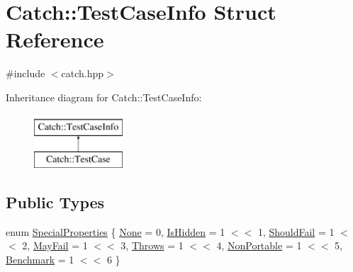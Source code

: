 \hypertarget{struct_catch_1_1_test_case_info}{}\section{Catch\+::Test\+Case\+Info Struct Reference}
\label{struct_catch_1_1_test_case_info}


{\ttfamily \#include $<$catch.\+hpp$>$}

Inheritance diagram for Catch\+::Test\+Case\+Info\+:\begin{figure}[H]
\begin{center}
\leavevmode
\includegraphics[height=2.000000cm]{struct_catch_1_1_test_case_info}
\end{center}
\end{figure}
\subsection*{Public Types}
\begin{DoxyCompactItemize}
\item 
enum \mbox{\hyperlink{struct_catch_1_1_test_case_info_a39b232f74b4a7a6f2183b96759027eac}{Special\+Properties}} \{ \newline
\mbox{\hyperlink{struct_catch_1_1_test_case_info_a39b232f74b4a7a6f2183b96759027eacaf94e9de5f8ec1e53b1aa761ec564b31a}{None}} = 0, 
\mbox{\hyperlink{struct_catch_1_1_test_case_info_a39b232f74b4a7a6f2183b96759027eacaeda53906c14c3973e0980900c132b8f7}{Is\+Hidden}} = 1 $<$$<$ 1, 
\mbox{\hyperlink{struct_catch_1_1_test_case_info_a39b232f74b4a7a6f2183b96759027eacaf9002285bccfc343935958f3953f4c01}{Should\+Fail}} = 1 $<$$<$ 2, 
\mbox{\hyperlink{struct_catch_1_1_test_case_info_a39b232f74b4a7a6f2183b96759027eacadf1873d3271121cb9f52d7df45b416ca}{May\+Fail}} = 1 $<$$<$ 3, 
\newline
\mbox{\hyperlink{struct_catch_1_1_test_case_info_a39b232f74b4a7a6f2183b96759027eaca4704adf89ed7f7ad653d08f99813a974}{Throws}} = 1 $<$$<$ 4, 
\mbox{\hyperlink{struct_catch_1_1_test_case_info_a39b232f74b4a7a6f2183b96759027eaca06472887b53fda9eb8015d74e7fd2cf1}{Non\+Portable}} = 1 $<$$<$ 5, 
\mbox{\hyperlink{struct_catch_1_1_test_case_info_a39b232f74b4a7a6f2183b96759027eacad0e25e337246ae34d555fe53baf81c16}{Benchmark}} = 1 $<$$<$ 6
 \}
\end{DoxyCompactItemize}
